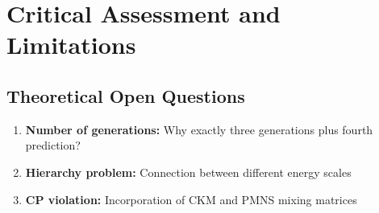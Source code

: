 	\section{Critical Assessment and Limitations}
	\label{sec:critical_assessment}

	\subsection{Theoretical Open Questions}
	\label{subsec:open_questions}
	
	\begin{enumerate}

		\item \textbf{Number of generations:} Why exactly three generations plus fourth prediction?
		\item \textbf{Hierarchy problem:} Connection between different energy scales
		\item \textbf{CP violation:} Incorporation of CKM and PMNS mixing matrices
	\end{enumerate}
	